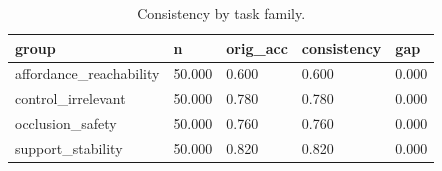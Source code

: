 \begin{table}[t]
\centering
\begin{tabular}{lllll}
\toprule
group & n & orig_acc & consistency & gap \\
\midrule
affordance_reachability & 50.000 & 0.600 & 0.600 & 0.000 \\
control_irrelevant & 50.000 & 0.780 & 0.780 & 0.000 \\
occlusion_safety & 50.000 & 0.760 & 0.760 & 0.000 \\
support_stability & 50.000 & 0.820 & 0.820 & 0.000 \\
\bottomrule
\end{tabular}
\caption{Consistency by task family.}
\end{table}
